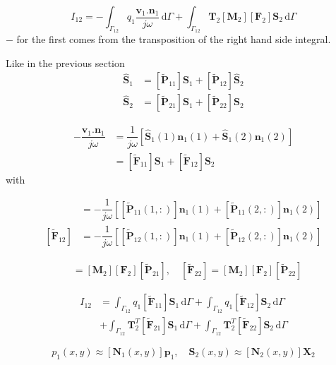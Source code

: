 \documentclass[11pt,A4paper]{book}
\newcommand{\ds}{\displaystyle}
\newcommand{\tb}{\textbf}
\newcommand{\tp}{^T}
\newcommand{\pt}{\textbf{.}}
\newcommand{\esp}{, \quad}
\newcommand{\wdt}[1]{\widetilde{#1}}
\renewcommand{\d}{\,\textrm{d}}
\renewcommand{\:}{\tb{:}}
\begin{document}
\begin{equation}
I_{12}=
-\ds{\int_{\Gamma_{12}}} 
q_1 \dfrac{\tb{v}_1\pt\tb{n}_1}{j\omega}
 \d\Gamma +
\ds{\int_{\Gamma_{12}}} 
\tb{T}_2 [\tb{M}_2][\tb{F}_2]\tb{S}_2 \d\Gamma 
\end{equation}
$-$ for the first comes from the transposition of the right hand side integral. 

Like in the previous section
\begin{align}
	\hat{\tb{S}}_1&=[\wdt{\tb{P}}_{11}]\tb{S}_1+[\wdt{\tb{P}}_{12}]\hat{\tb{S}}_2\\
	\hat{\tb{S}}_2&=[\wdt{\tb{P}}_{21}]\tb{S}_1+[\wdt{\tb{P}}_{22}]\tb{S}_2
\end{align}


\begin{align}
	-\dfrac{\tb{v}_1\pt\tb{n}_1}{j\omega}&=\dfrac{1}{j\omega}
	\left[\hat{\tb{S}}_1(1)\tb{n}_1(1)+\hat{\tb{S}}_1(2)\tb{n}_1(2)\right]\\
	&=[\wdt{\tb{F}}_{11}]\tb{S}_1+[\wdt{\tb{F}}_{12}]\tb{S}_2
\end{align}
with


\begin{align}
 [\wdt{\tb{F}}_{11}]&=-\dfrac{1}{j\omega}
	\left[[\wdt{\tb{P}}_{11}(1,:)]\tb{n}_1(1)+[\wdt{\tb{P}}_{11}(2,:)]\tb{n}_1(2)\right]\\
	[\wdt{\tb{F}}_{12}]&=-\dfrac{1}{j\omega}
	\left[[\wdt{\tb{P}}_{12}(1,:)]\tb{n}_1(1)+[\wdt{\tb{P}}_{12}(2,:)]\tb{n}_1(2)\right]
\end{align}






\begin{align}
[\wdt{\tb{F}}_{21}]&=[\tb{M}_2] [\tb{F}_2] 
[\wdt{\tb{P}}_{21}] \esp [\wdt{\tb{F}}_{22}]=[\tb{M}_2] [\tb{F}_2] 
[\wdt{\tb{P}}_{22}]
\end{align}



\begin{align}
I_{12}&=
\ds{\int_{\Gamma_{12}}} 
q_1 [\wdt{\tb{F}}_{11}]\tb{S}_1
 \d\Gamma +\ds{\int_{\Gamma_{12}}} 
q_1 [\wdt{\tb{F}}_{12}]\tb{S}_2
 \d\Gamma\\
 &+
\ds{\int_{\Gamma_{12}}} 
\tb{T}_2\tp [\wdt{\tb{F}}_{21}]\tb{S}_1 \d\Gamma +
\ds{\int_{\Gamma_{12}}} 
\tb{T}_2\tp [\wdt{\tb{F}}_{22}]\tb{S}_2 \d\Gamma
\end{align}



\begin{equation}
p_1(x,y)\approx[\tb{N}_1(x,y)]\tb{p}_1 \esp \tb{S}_2(x,y)\approx[\tb{N}_2(x,y)]\tb{X}_2
\end{equation}
\end{document}
